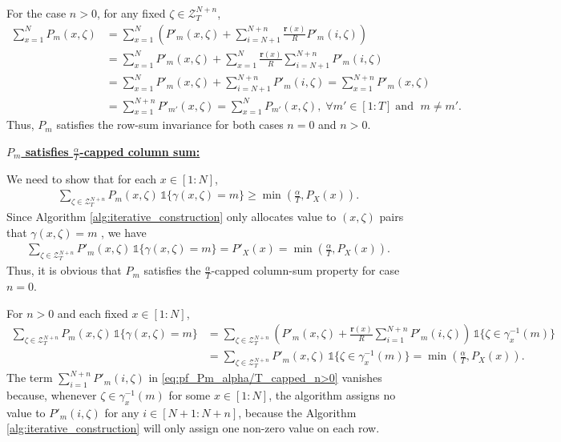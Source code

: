 \documentclass[11pt,letterpaper]{article}
\newcommand{\cZ}{\mathcal{Z}}
\begin{document}
For the case $n>0$, for any fixed $\zeta \in \cZ^{N+n}_T$, 
\begin{align*}
    \sum_{x=1}^N P_m(x,\zeta) & = \sum_{x=1}^N \left( P'_m(x,\zeta) + \sum_{i=N+1}^{N+n} \tfrac{\boldsymbol{r}(x)}{R}P'_m(i,\zeta) \right) \\&= \sum_{x=1}^N P'_m(x,\zeta) + \sum_{x=1}^N \tfrac{\boldsymbol{r}(x)}{R} \sum_{i=N+1}^{N+n}P'_m(i,\zeta) \\
    & = \sum_{x=1}^N P'_m(x,\zeta) +\sum_{i=N+1}^{N+n}P'_m(i,\zeta) = \sum_{x=1}^{N+n}P'_m(x,\zeta) \\
    &= \sum_{x=1}^{N+n}P'_{m'}(x,\zeta) = \sum_{x=1}^N P_{m'}(x,\zeta), \; \forall m' \in [1:T] \;  \text{and } \; m \neq m'.
\end{align*}
Thus, $P_m$ satisfies the row-sum invariance for both cases $n = 0$ and $n >0$. 

\underline{\textbf{$P_m$ satisfies $\tfrac{\alpha}{T}$-capped column sum:}}

We need to show that for each $x \in [1:N]$, 
\begin{align*}
    \sum_{\zeta \in \cZ^{N+n}_T} P_m(x,\zeta)\,\mathds{1}\{\gamma(x,\zeta) = m \} \geq \min\left(\frac{\alpha}{T}, P_X(x)\right). 
\end{align*}
Since Algorithm \ref{alg:iterative_construction} only allocates value to $(x,\zeta)$ pairs that $\gamma(x,\zeta) = m $ , we have 
\begin{align*}
    \sum_{\zeta \in \cZ^{N+n}_T} P'_m(x,\zeta)\,\mathds{1}\{\gamma(x,\zeta) = m \} = P'_X(x) = \min\left(\frac{\alpha}{T}, P_X(x)\right). 
\end{align*}
Thus, it is obvious that $P_m$ satisfies the $\tfrac{\alpha}{T}$-capped column-sum property for case $n=0$. 

For $n > 0$ and each fixed $x \in [1:N]$, 
\begin{align}
    \sum_{\zeta \in \cZ^{N+n}_T} P_m(x,\zeta)\,\mathds{1}\{\gamma(x,\zeta) = m \} & = \sum_{\zeta \in \cZ^{N+n}_T} \left(P'_m(x,\zeta) + \tfrac{\boldsymbol{r}(x)}{R} \sum_{i=1}^{N+n}P'_m(i,\zeta) \right) \,\mathds{1}\{\zeta \in \gamma_x^{-1}(m)\} \label{eq:pf_Pm_alpha/T_capped_n>0}\\
    & = \sum_{\zeta \in \cZ^{N+n}_T} P'_m(x,\zeta) \,\mathds{1}\{\zeta \in \gamma_x^{-1}(m)\} = \min\left(\frac{\alpha}{T}, P_X(x)\right).
\end{align}
The term $\sum_{i=1}^{N+n}P'_m(i,\zeta)$ in \eqref{eq:pf_Pm_alpha/T_capped_n>0} vanishes because, whenever $\zeta \in \gamma_x^{-1}(m)$ for some $x\in [1:N]$, the algorithm assigns no value to $P'_m(i,\zeta)$ for any $i \in [N+1:N+n]$, because the Algorithm \ref{alg:iterative_construction} will only assign one non-zero value on each row.
\end{document}
